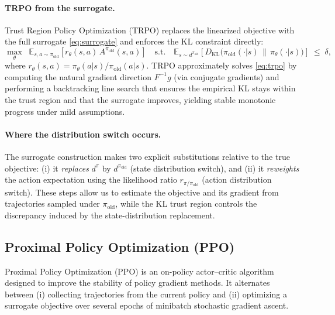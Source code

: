 \paragraph{TRPO from the surrogate.}
Trust Region Policy Optimization (TRPO) replaces the linearized objective with the full surrogate \eqref{eq:surrogate}
and enforces the KL constraint directly:
\begin{equation}
\label{eq:trpo}
\max_{\theta}\;\;
\mathbb{E}_{s,a \sim \pi_{\text{old}}}
\!\left[ r_\theta(s,a)\, A^{\pi_{\text{old}}}(s,a) \right]
\quad \text{s.t.} \quad
\mathbb{E}_{s \sim d^{\pi_{\text{old}}}}
\!\left[ D_{\mathrm{KL}}\big(\pi_{\text{old}}(\cdot|s)\,\|\,\pi_\theta(\cdot|s)\big) \right] \;\le\; \delta,
\end{equation}
where $r_\theta(s,a)=\pi_\theta(a|s)/\pi_{\text{old}}(a|s)$.
TRPO approximately solves \eqref{eq:trpo} by computing the natural gradient direction $F^{-1}g$
(via conjugate gradients) and performing a backtracking line search that ensures the empirical KL stays within the trust region
and that the surrogate improves, yielding stable monotonic progress under mild assumptions.

\paragraph{Where the distribution switch occurs.}
The surrogate construction makes two explicit substitutions relative to the true objective:
(i) it \emph{replaces} $d^{\pi}$ by $d^{\pi_{\text{old}}}$ (state distribution switch), and
(ii) it \emph{reweights} the action expectation using the likelihood ratio $r_{\pi/\pi_{\text{old}}}$ (action distribution switch).
These steps allow us to estimate the objective and its gradient from trajectories sampled under $\pi_{\text{old}}$, while the KL trust region controls the discrepancy induced by the state-distribution replacement.





\subsection{Proximal Policy Optimization (PPO)}

Proximal Policy Optimization (PPO) \cite{schulman2017proximal} is an on-policy actor--critic algorithm
designed to improve the stability of policy gradient methods. 
It alternates between (i) collecting trajectories from the current policy and (ii) optimizing a surrogate objective 
over several epochs of minibatch stochastic gradient ascent.

